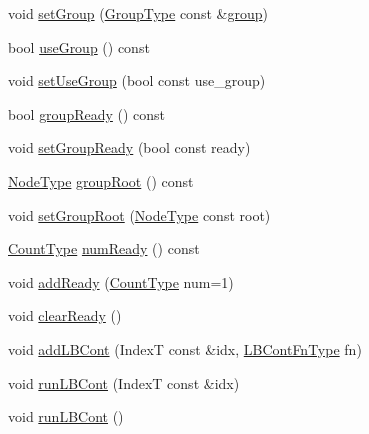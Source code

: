 \begin{DoxyCompactItemize}
\item 
void \hyperlink{structvt_1_1vrt_1_1collection_1_1_holder_ad1004d701690d7de8d323de1d5bc1a29}{set\+Group} (\hyperlink{namespacevt_a27b5e4411c9b6140c49100e050e2f743}{Group\+Type} const \&\hyperlink{structvt_1_1vrt_1_1collection_1_1_holder_a579e33999a2d66ded9c3751be3ba11f8}{group})
\item 
bool \hyperlink{structvt_1_1vrt_1_1collection_1_1_holder_af9a9e5dbf89d84e9fb4d267f720bfa4e}{use\+Group} () const
\item 
void \hyperlink{structvt_1_1vrt_1_1collection_1_1_holder_aa76e02e027429572c1c9b2169d013e56}{set\+Use\+Group} (bool const use\+\_\+group)
\item 
bool \hyperlink{structvt_1_1vrt_1_1collection_1_1_holder_afeafe4c77613531a166be80bdaea4fd6}{group\+Ready} () const
\item 
void \hyperlink{structvt_1_1vrt_1_1collection_1_1_holder_aa666f9e2960605203d325fd39de82dd7}{set\+Group\+Ready} (bool const ready)
\item 
\hyperlink{namespacevt_a866da9d0efc19c0a1ce79e9e492f47e2}{Node\+Type} \hyperlink{structvt_1_1vrt_1_1collection_1_1_holder_a4712da9a79782e5c33de2773d66cc587}{group\+Root} () const
\item 
void \hyperlink{structvt_1_1vrt_1_1collection_1_1_holder_a9805b84e57120bc7088058f782eb56f4}{set\+Group\+Root} (\hyperlink{namespacevt_a866da9d0efc19c0a1ce79e9e492f47e2}{Node\+Type} const root)
\item 
\hyperlink{structvt_1_1vrt_1_1collection_1_1_holder_a3251a556ac19fc7dc4d0bd388cfaedeb}{Count\+Type} \hyperlink{structvt_1_1vrt_1_1collection_1_1_holder_a9911d92bf71796a7c4b83ebe60db1f5e}{num\+Ready} () const
\item 
void \hyperlink{structvt_1_1vrt_1_1collection_1_1_holder_ac41862395e0a1f6d0e68ebcd17c44824}{add\+Ready} (\hyperlink{structvt_1_1vrt_1_1collection_1_1_holder_a3251a556ac19fc7dc4d0bd388cfaedeb}{Count\+Type} num=1)
\item 
void \hyperlink{structvt_1_1vrt_1_1collection_1_1_holder_a2a16bdae9bb011c1f32cd1cbf4a93f55}{clear\+Ready} ()
\item 
void \hyperlink{structvt_1_1vrt_1_1collection_1_1_holder_a9f0e6df0202f45cdfb8b190fbce86141}{add\+L\+B\+Cont} (IndexT const \&idx, \hyperlink{structvt_1_1vrt_1_1collection_1_1_holder_a01812f8ee06d3a67e1a9aa2765989913}{L\+B\+Cont\+Fn\+Type} fn)
\item 
void \hyperlink{structvt_1_1vrt_1_1collection_1_1_holder_a0e7fd8983ff18f85b7a2360b3732ef0a}{run\+L\+B\+Cont} (IndexT const \&idx)
\item 
void \hyperlink{structvt_1_1vrt_1_1collection_1_1_holder_a4cb7b41d1bbdf4531e89ad56e24def97}{run\+L\+B\+Cont} ()
\end{DoxyCompactItemize}
